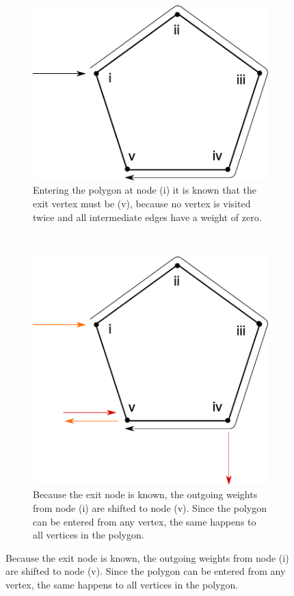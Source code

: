 \begin{figure}
\begin{subfigure}[t]{0.45\textwidth}
\includegraphics[width=1\textwidth]{images/path_planning/tsp_polygon_2.pdf}
\caption{Entering the polygon at node (i) it is known that the exit vertex must be (v), because no vertex is visited twice and all intermediate edges have a weight of zero.}
\end{subfigure}
~
\begin{subfigure}[t]{0.45\textwidth}
\includegraphics[width=1\textwidth]{images/path_planning/tsp_polygon_3.pdf}
\caption{Because the exit node is known, the outgoing weights from node (i) are shifted to node (v). Since the polygon can be entered from any vertex, the same happens to all vertices in the polygon.}
\end{subfigure}

\end{figure}


